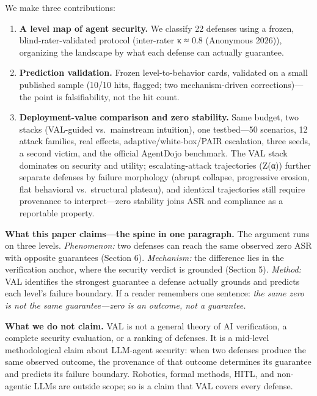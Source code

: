 \documentclass[

]{article}
\providecommand{\tightlist}{%

  \setlength{\itemsep}{0pt}\setlength{\parskip}{0pt}}
\begin{document}
We make three contributions:



\begin{enumerate}

\def\labelenumi{\arabic{enumi}.}

\tightlist

\item

  \textbf{A level map of agent security.} We classify 22 defenses using a frozen, blind-rater-validated protocol (inter-rater κ ≈ 0.8 (Anonymous 2026)), organizing the landscape by what each defense can actually guarantee.

\item

  \textbf{Prediction validation.} Frozen level-to-behavior cards, validated on a small published sample (10/10 hits, flagged; two mechanism-driven corrections)---the point is falsifiability, not the hit count.

\item

  \textbf{Deployment-value comparison and zero stability.} Same budget, two stacks (VAL-guided vs.~mainstream intuition), one testbed---50 scenarios, 12 attack families, real effects, adaptive/white-box/PAIR escalation, three seeds, a second victim, and the official AgentDojo benchmark. The VAL stack dominates on security and utility; escalating-attack trajectories (Z(α)) further separate defenses by failure morphology (abrupt collapse, progressive erosion, flat behavioral vs.~structural plateau), and identical trajectories still require provenance to interpret---zero stability joins ASR and compliance as a reportable property.

\end{enumerate}



\textbf{What this paper claims---the spine in one paragraph.} The argument runs on three levels. \emph{Phenomenon:} two defenses can reach the same observed zero ASR with opposite guarantees (Section 6). \emph{Mechanism:} the difference lies in the verification anchor, where the security verdict is grounded (Section 5). \emph{Method:} VAL identifies the strongest guarantee a defense actually grounds and predicts each level's failure boundary. If a reader remembers one sentence: \emph{the same zero is not the same guarantee---zero is an outcome, not a guarantee.}



\textbf{What we do not claim.} VAL is not a general theory of AI verification, a complete security evaluation, or a ranking of defenses. It is a mid-level methodological claim about LLM-agent security: when two defenses produce the same observed outcome, the provenance of that outcome determines its guarantee and predicts its failure boundary. Robotics, formal methods, HITL, and non-agentic LLMs are outside scope; so is a claim that VAL covers every defense.
\end{document}
